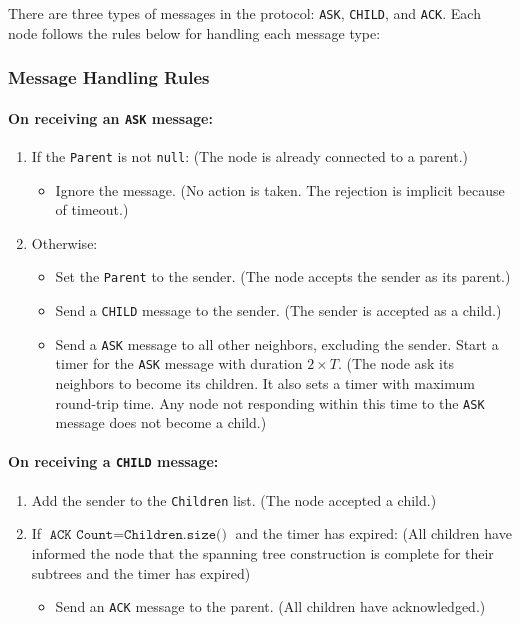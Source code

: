 There are three types of messages in the protocol: \texttt{ASK}, \texttt{CHILD}, and \texttt{ACK}. Each node follows the rules below for handling each message type:

\subsubsection{Message Handling Rules}

\paragraph{On receiving an \texttt{ASK} message:}
\begin{enumerate}
    \item If the \texttt{Parent} is not \texttt{null}: (The node is already connected to a parent.)
    \begin{itemize}
        \item Ignore the message. (No action is taken. The rejection is implicit because of timeout.)
    \end{itemize}
    \item Otherwise:
    \begin{itemize}
        \item Set the \texttt{Parent} to the sender. (The node accepts the sender as its parent.)
        \item Send a \texttt{CHILD} message to the sender. (The sender is accepted as a child.)
        \item Send a \texttt{ASK} message to all other neighbors, excluding the sender. Start a timer for the \texttt{ASK} message with duration \(2\times T\). (The node ask its neighbors to become its children. It also sets a timer with maximum round-trip time. Any node not responding within this time to the \texttt{ASK} message does not become a child.)
    \end{itemize}
\end{enumerate}

\paragraph{On receiving a \texttt{CHILD} message:}
\begin{enumerate}
    \item Add the sender to the \texttt{Children} list. (The node accepted a child.)
    \item If \(\texttt{ACK Count} = \texttt{Children.size()}\) and the timer has expired: (All children have informed the node that the spanning tree construction is complete for their subtrees and the timer has expired)
    \begin{itemize}
        \item Send an \texttt{ACK} message to the parent. (All children have acknowledged.)
    \end{itemize}
\end{enumerate}

